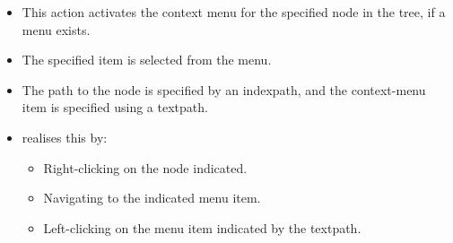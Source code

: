 \begin{itemize}
\item This action activates the context menu for the specified node in the tree, if a menu exists.
\item The specified item is  selected from the menu.
\item The path to the node is specified by an indexpath, and the context-menu item is specified using a textpath.
\item \gd{} realises this by:
  \begin{itemize}
    \item Right-clicking on the node indicated.
    \item Navigating to the indicated menu item.
    \item Left-clicking on the menu item indicated by the textpath.
  \end{itemize}
\end{itemize}
